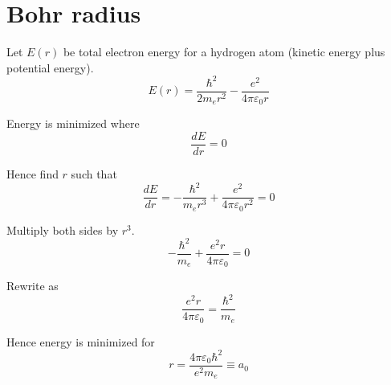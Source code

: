 

\section*{Bohr radius}

Let $E(r)$ be total electron energy for a hydrogen atom (kinetic energy plus potential energy).
\begin{equation*}
E(r)=\frac{\hbar^2}{2m_er^2}-\frac{e^2}{4\pi\varepsilon_0r}
\end{equation*}

Energy is minimized where
\begin{equation*}
\frac{dE}{dr}=0
\end{equation*}

Hence find $r$ such that
\begin{equation*}
\frac{dE}{dr}=-\frac{\hbar^2}{m_er^3}+\frac{e^2}{4\pi\varepsilon_0r^2}=0
\end{equation*}

Multiply both sides by $r^3$.
\begin{equation*}
-\frac{\hbar^2}{m_e}+\frac{e^2r}{4\pi\varepsilon_0}=0
\end{equation*}

Rewrite as
\begin{equation*}
\frac{e^2r}{4\pi\varepsilon_0}=\frac{\hbar^2}{m_e}
\end{equation*}

Hence energy is minimized for
\begin{equation*}
r=\frac{4\pi\varepsilon_0\hbar^2}{e^2m_e}\equiv a_0
\end{equation*}


